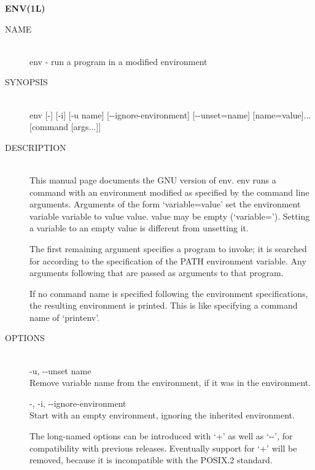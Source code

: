 
\begin{center} {\bf
ENV(1L)
} \end{center}
\begin{description}

\item[NAME] \hfill \\
       env - run a program in a modified environment

\item[SYNOPSIS] \hfill \\
       env    [-]    [-i]    [-u   name]   [-\hspace{.01cm}-ignore-environment]
       [-\hspace{.01cm}-unset=name] [name=value]... [command [args...]]

\item[DESCRIPTION] \hfill \\
       This manual page documents the GNU version  of  env.   env
       runs  a  command with an environment modified as specified
       by the command line  arguments.   Arguments  of  the  form
       `variable=value'  set the environment variable variable to
       value value.  value may be empty (`variable=').  Setting a
       variable to an empty value is different from unsetting it.

       The  first  remaining  argument  specifies  a  program  to
       invoke;  it is searched for according to the specification
       of the PATH environment variable.  Any arguments following
       that are passed as arguments to that program.

       If  no command name is specified following the environment
       specifications,  the  resulting  environment  is  printed.
       This is like specifying a command name of `printenv'.

\item[OPTIONS] \hfill \\
       -u, -\hspace{.01cm}-unset name \\
              Remove  variable  name  from the environment, if it
              was in the environment.

       -, -i, -\hspace{.01cm}-ignore-environment \\
              Start  with  an  empty  environment,  ignoring  the
              inherited environment.

       The  long-named options can be introduced with `+' as well
       as `-\hspace{.01cm}-', for compatibility with previous releases.   
       Eventually  support  for  `+'  will  be removed, because it 
       is incompatible with the POSIX.2 standard.
\end{description}
 
